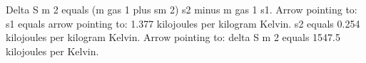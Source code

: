 Delta S m 2 equals (m gas 1 plus sm 2) s2 minus m gas 1 s1.  
Arrow pointing to: s1 equals arrow pointing to: 1.377 kilojoules per kilogram Kelvin.  
s2 equals 0.254 kilojoules per kilogram Kelvin.  
Arrow pointing to: delta S m 2 equals 1547.5 kilojoules per Kelvin.